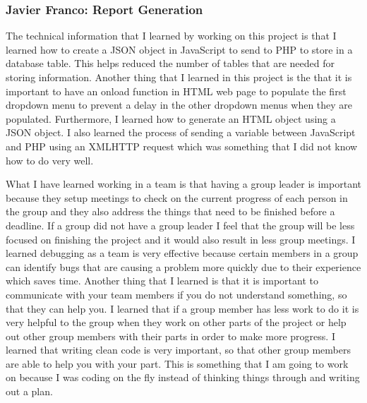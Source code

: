 \documentclass[../final.tex]{subfiles}
\begin{document}
\subsubsection{Javier Franco: Report Generation}
The technical information that I learned by working on this project is that I learned how to create a JSON object in JavaScript to send to PHP to store in a database table. This helps reduced the number of tables that are needed for storing information. Another thing that I learned in this project is the that it is important to have an onload function in HTML web page to populate the first dropdown menu to prevent a delay in the other dropdown menus when they are populated. Furthermore, I learned how to generate an HTML object using a JSON object. I also learned the process of sending a variable between JavaScript and PHP using an XMLHTTP request which was something that I did not know how to do very well. 

 What I have learned working in a team is that having a group leader is important because they setup meetings to check on the current progress of each person in the group and they also address the things that need to be finished before a deadline. If a group did not have a group leader I feel that the group will be less focused on finishing the project and it would also result in less group meetings. I learned debugging as a team is very effective because certain members in a group can identify bugs that are causing a problem more quickly due to their experience which saves time. Another thing that I learned is that it is important to communicate with your team members if you do not understand something, so that they can help you. I learned that if a group member has less work to do it is very helpful to the group when they work on other parts of the project or help out other group members with their parts in order to make more progress. I learned that writing clean code is very important, so that other group members are able to help you with your part. This is something that I am going to work on because I was coding on the fly instead of thinking things through and writing out a plan.
 
\end{document}

